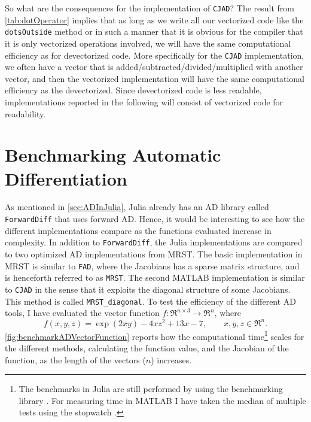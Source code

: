 So what are the consequences for the implementation of \texttt{CJAD}? The result from \autoref{tab:dotOperator} implies that as long as we write all our vectorized code like the \texttt{dotsOutside} method or in such a manner that it is obvious for the compiler that it is only vectorized operations involved, we will have the same computational efficiency as for devectorized code. More specifically for the \texttt{CJAD} implementation, we often have a vector that is added/subtracted/divided/multiplied with another vector, and then the vectorized implementation will have the same computational efficiency as the devectorized. Since devectorized code is less readable,  implementations reported in the following will consist of vectorized code for readability.

\section{Benchmarking Automatic Differentiation}
As mentioned in \autoref{sec:ADInJulia}, Julia already has an AD library called \texttt{ForwardDiff} \citep{ForwardDiff} that uses forward AD. Hence, it would be interesting to see how the different implementations compare as the functions evaluated increase in complexity. In addition to \texttt{ForwardDiff}, the Julia implementations are compared to two optimized AD implementations from MRST. The basic implementation in MRST is similar to \texttt{FAD}, where the Jacobians has a sparse matrix structure, and is henceforth referred to as \texttt{MRST}. The second MATLAB implementation is similar to \texttt{CJAD} in the sense that it exploits the diagonal structure of some Jacobians. This method is called \texttt{MRST\_diagonal}. To test the efficiency of the different AD tools, I have evaluated the vector function $f: \Re^{n\times 3} \rightarrow \Re^n $, where
\begin{equation}
\label{eq:benchmarkFunction}
f(x,y,z)  = \exp(2xy) - 4xz^2 + 13x - 7, \qquad x,y,z \in \Re^n.
\end{equation}
\autoref{fig:benchmarkADVectorFunction} reports how the computational time\footnote{The benchmarks in Julia are still performed by using the benchmarking library \emph{\cite{BenchmarkTools}}. For measuring time in MATLAB I have taken the median of multiple tests using the stopwatch \emph{\cite{TicToc}}.} scales for the different methods, calculating the function value, and the Jacobian of the function, as the length of the vectors ($n$) increases.

